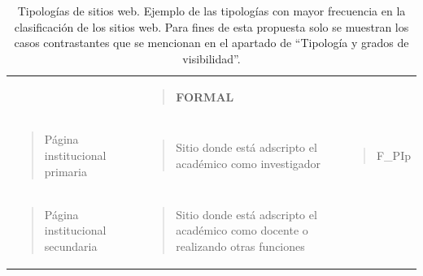 \documentclass[
  spanish,
  11pt,
  a4paper,
]{scrbook}
\begin{document}
\begin{longtable}[]{@{}
  >{\raggedright\arraybackslash}p{}
  >{\raggedright\arraybackslash}p{}
  >{\raggedright\arraybackslash}p{}@{}}
\caption{Tipologías de sitios web. Ejemplo de las tipologías con mayor
frecuencia en la clasificación de los sitios web. Para fines de esta
propuesta solo se muestran los casos contrastantes que se mencionan en
el apartado de ``Tipología y grados de
visibilidad''.}\label{tbl-2}\tabularnewline
\toprule\noalign{}
\endfirsthead
\endhead
\bottomrule\noalign{}
\endlastfoot
& \begin{minipage}[t]{\linewidth}\raggedright
\begin{quote}
\textbf{FORMAL}
\end{quote}
\end{minipage} & \\
\begin{minipage}[t]{\linewidth}\raggedright
\begin{quote}
Página institucional primaria
\end{quote}
\end{minipage} & \begin{minipage}[t]{\linewidth}\raggedright
\begin{quote}
Sitio donde está adscripto el académico como investigador
\end{quote}
\end{minipage} & \begin{minipage}[t]{\linewidth}\raggedright
\begin{quote}
F\_PIp
\end{quote}
\end{minipage} \\
\begin{minipage}[t]{\linewidth}\raggedright
\begin{quote}
Página institucional secundaria
\end{quote}
\end{minipage} & \begin{minipage}[t]{\linewidth}\raggedright
\begin{quote}
Sitio donde está adscripto el académico como docente o realizando otras
funciones
\end{quote}
\end{minipage} & \begin{minipage}[t]{\linewidth}\raggedright
\begin{quote}

\end{quote}
\end{minipage}
\end{longtable}
\end{document}

